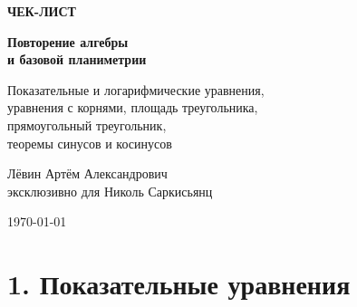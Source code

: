\documentclass[a4paper,12pt]{article}
\begin{document}

\begin{titlepage}
\thispagestyle{empty}

\begin{center}

\vspace*{2.2cm}

{\Large\textcolor{accent}{\textbf{ЧЕК-ЛИСТ}}}

\vspace{0.8cm}

{\Huge\bfseries
Повторение алгебры\\[0.3em]
и базовой планиметрии
}

\vspace{0.9cm}

{\Large
Показательные и логарифмические уравнения,\\
уравнения с корнями, площадь треугольника,\\
прямоугольный треугольник,\\
теоремы синусов и косинусов
}

\vspace{1.7cm}

{\large
\textcolor{darkaccent}{
Лёвин Артём Александрович\\
эксклюзивно для Николь Саркисьянц
}
}

\vfill

{\large \today}

\vspace{1.3cm}


\end{center}
\end{titlepage}


\section*{\textcolor{darkaccent}{1. Показательные уравнения}}
\end{document}
